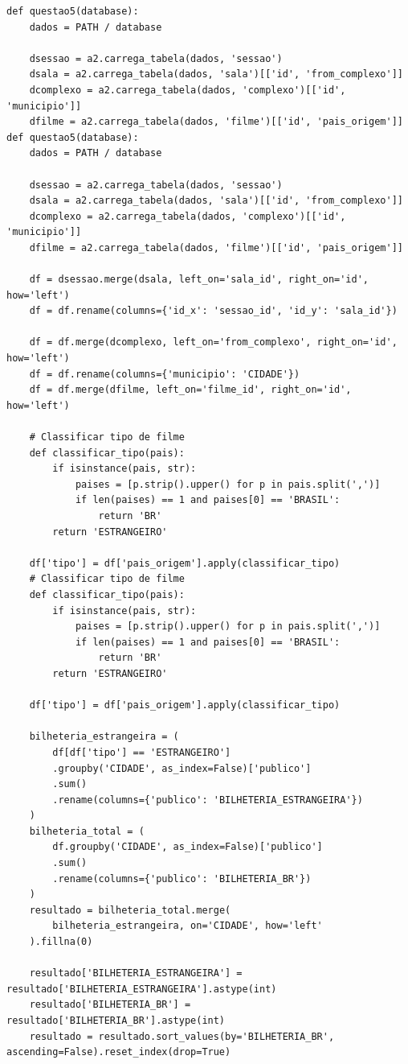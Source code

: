 \documentclass{article}
\begin{document}
\begin{lstlisting}
def questao5(database):
    dados = PATH / database

    dsessao = a2.carrega_tabela(dados, 'sessao')
    dsala = a2.carrega_tabela(dados, 'sala')[['id', 'from_complexo']]
    dcomplexo = a2.carrega_tabela(dados, 'complexo')[['id', 'municipio']]
    dfilme = a2.carrega_tabela(dados, 'filme')[['id', 'pais_origem']]
def questao5(database):
    dados = PATH / database

    dsessao = a2.carrega_tabela(dados, 'sessao')
    dsala = a2.carrega_tabela(dados, 'sala')[['id', 'from_complexo']]
    dcomplexo = a2.carrega_tabela(dados, 'complexo')[['id', 'municipio']]
    dfilme = a2.carrega_tabela(dados, 'filme')[['id', 'pais_origem']]

    df = dsessao.merge(dsala, left_on='sala_id', right_on='id', how='left')
    df = df.rename(columns={'id_x': 'sessao_id', 'id_y': 'sala_id'})

    df = df.merge(dcomplexo, left_on='from_complexo', right_on='id', how='left')
    df = df.rename(columns={'municipio': 'CIDADE'})
    df = df.merge(dfilme, left_on='filme_id', right_on='id', how='left')

    # Classificar tipo de filme
    def classificar_tipo(pais):
        if isinstance(pais, str):
            paises = [p.strip().upper() for p in pais.split(',')]
            if len(paises) == 1 and paises[0] == 'BRASIL':
                return 'BR'
        return 'ESTRANGEIRO'

    df['tipo'] = df['pais_origem'].apply(classificar_tipo)
    # Classificar tipo de filme
    def classificar_tipo(pais):
        if isinstance(pais, str):
            paises = [p.strip().upper() for p in pais.split(',')]
            if len(paises) == 1 and paises[0] == 'BRASIL':
                return 'BR'
        return 'ESTRANGEIRO'

    df['tipo'] = df['pais_origem'].apply(classificar_tipo)

    bilheteria_estrangeira = (
        df[df['tipo'] == 'ESTRANGEIRO']
        .groupby('CIDADE', as_index=False)['publico']
        .sum()
        .rename(columns={'publico': 'BILHETERIA_ESTRANGEIRA'})
    )
    bilheteria_total = (
        df.groupby('CIDADE', as_index=False)['publico']
        .sum()
        .rename(columns={'publico': 'BILHETERIA_BR'})
    )
    resultado = bilheteria_total.merge(
        bilheteria_estrangeira, on='CIDADE', how='left'
    ).fillna(0)

    resultado['BILHETERIA_ESTRANGEIRA'] = resultado['BILHETERIA_ESTRANGEIRA'].astype(int)
    resultado['BILHETERIA_BR'] = resultado['BILHETERIA_BR'].astype(int)
    resultado = resultado.sort_values(by='BILHETERIA_BR', ascending=False).reset_index(drop=True)


\end{lstlisting}
\end{document}
